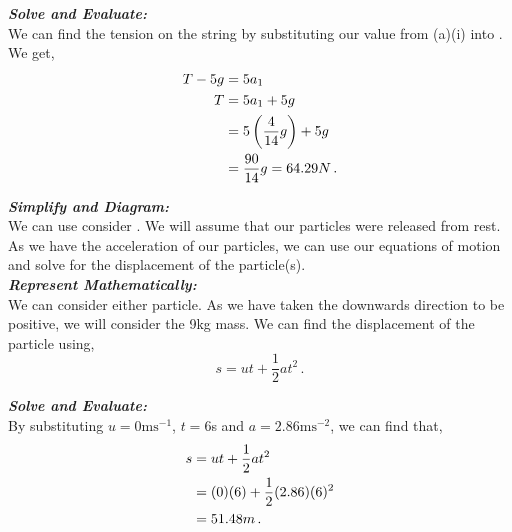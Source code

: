 \begin{subquestions}
\begin{subsubquestions}

\subsubquestion

\textbf{\textit{Solve and Evaluate:}} \\
We can find the tension on the string by substituting our value from (a)(i) into . We get,
\begin{align}
	T-5g & = 5a_1 \nonumber \\
	T & = 5a_1 + 5g \nonumber \\
	  & = 5\left(\frac{4}{14}g \right) + 5g \nonumber \\
	  & = \frac{90}{14}g = 64.29N \,.
\end{align}


\subsubquestion

\textbf{\textit{Simplify and Diagram:}} \\
We can use consider . We will assume that our particles were released from rest. As we have the acceleration of our particles, we can use our equations of motion and solve for the displacement of the particle(s).\\




\textbf{\textit{Represent Mathematically:}} \\
We can consider either particle. As we have taken the downwards direction to be positive, we will consider the 9kg mass. We can find the displacement of the particle using,
\begin{equation}
	s=ut+\frac{1}{2}at^2 \,.
\end{equation}




\textbf{\textit{Solve and Evaluate:}} \\
By substituting $u=0\text{ms}^{-1}$, $t=6$s and $a=2.86\text{ms}^{-2}$, we can find that,
\begin{align}
	s & = ut+\frac{1}{2}at^2 \nonumber \\
	  & = (0)(6) + \frac{1}{2}(2.86)(6)^2 \nonumber \\
	  & = 51.48m \,.
\end{align}

\end{subsubquestions}



\end{subquestions}
